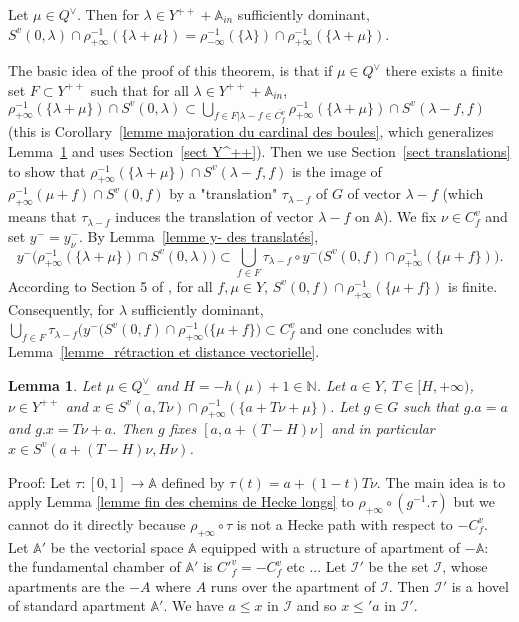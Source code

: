 \documentclass[12pt]{article}
\theoremstyle{plain}
\newtheorem{lemme}[thm]{Lemma}
\theoremstyle{definition}
\newcommand{\A}{\mathbb{A}}
\newcommand{\N}{\mathbb{N}}
\newcommand{\I}{\mathcal{I}}
\begin{document}
 Let $\mu\in Q^\vee$. Then for $\lambda\in Y^{++}+\A_{in}$ sufficiently dominant, $S^v(0,\lambda)\cap \rho_{+\infty}^{-1}(\{\lambda+\mu\})=\rho_{-\infty}^{-1}(\{\lambda\})\cap\rho_{+\infty}^{-1}(\{\lambda+\mu\})$.

The basic idea of the proof of this theorem, is that if $\mu\in Q^\vee$ there exists a finite set $F\subset Y^{++}$ such that for all $\lambda\in Y^{++}+\A_{in}$, $\rho_{+\infty}^{-1}(\{\lambda+\mu\})\cap S^v(0,\lambda) \subset \bigcup_{f\in F|\lambda-f\in\overline{C^v_f}} \rho_{+\infty}^{-1}(\{\lambda+\mu\})\cap S^v(\lambda-f,f)$ (this is Corollary~\ref{lemme majoration du cardinal des boules}, which generalizes Lemma~\ref{lemme distance finie à l'appartement} and uses Section~\ref{sect Y^++}). Then we use Section~\ref{sect translations} to show  that $\rho_{+\infty}^{-1}(\{\lambda+\mu\})\cap S^v(\lambda-f,f)$ is the image of $\rho_{+\infty}^{-1}(\mu+f)\cap S^v(0,f)$ by a "translation" $\tau_{\lambda-f}$ of $G$ of vector $\lambda-f$ (which means that $\tau_{\lambda-f}$ induces the translation of vector $\lambda-f$ on $\mathbb{A}$). We fix $\nu\in C_f^v$ and set $y^-=y_\nu^-$. By Lemma~\ref{lemme y- des translatés},  \[y^-\big(\rho_{+\infty}^{-1}(\{\lambda+\mu\})\cap S^v(0,\lambda)\big)\subset\bigcup_{f\in F}\tau_{\lambda-f}\circ y^-\big(S^v(0,f)\cap \rho_{+\infty}^{-1}(\{\mu +f\})\big).\] According to Section 5 of \cite{gaussent2014spherical}, for all $f, \mu \in Y$, $S^v(0,f)\cap \rho_{+\infty}^{-1}(\{\mu +f\})$ is finite. Consequently, for $\lambda$ sufficiently dominant, $\bigcup_{f\in F}\tau_{\lambda-f}\big(y^-(S^v(0,f)\cap \rho_{+\infty}^{-1}(\{\mu +f\}\big)\subset C^v_f$  and one concludes with Lemma~\ref{lemme_rétraction et distance vectorielle}. 
 



\begin{lemme}\label{lemme distance finie à l'appartement}
Let $\mu\in Q^\vee_-$ and $H=-h(\mu)+1\in \N$. Let $a\in Y$, $T\in [H,+\infty)$, $\nu\in Y^{++}$ and $x\in S^v(a,T\nu)\cap\rho_{+\infty}^{-1}(\{a+T\nu+\mu\})$. Let $g\in G$ such that $g.a=a$ and $g.x=T\nu+a$. Then $g$ fixes $[a,a+(T-H)\nu]$ and in particular $x\in S^v(a+(T-H)\nu,H\nu)$.
\end{lemme}

Proof: Let $\tau:[0,1]\rightarrow \mathbb{A}$ defined by $\tau(t)=a+(1-t)T\nu$. The main idea is to apply Lemma \ref{lemme fin des chemins de Hecke longs} to $\rho_{+\infty}\circ (g^{-1}.\tau)$ but we cannot do it directly because $\rho_{+\infty}\circ\tau$ is not a Hecke path with respect to $-C^v_f$. Let $\mathbb{A}'$ be the vectorial space $\mathbb{A}$ equipped with a structure of apartment of $-\mathbb{A}$: the fundamental chamber of $\mathbb{A}'$ is $C'^v_f=-C^v_f$ etc ... Let $\mathcal{I}'$ be the set $\mathcal{I}$, whose apartments are the $-A$ where $A$ runs over the apartment of $\I$. Then $\mathcal{I}'$ is a hovel of standard apartment $\mathbb{A}'$. We have $a\leq x$ in $\mathcal{I}$ and so $x\leq'a$ in $\mathcal{I}'$. 
 
\end{document}
